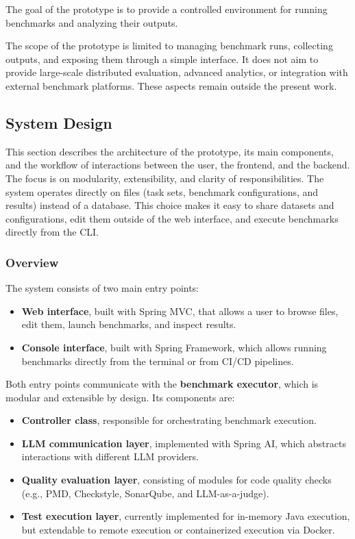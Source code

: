 The goal of the prototype is to provide a controlled environment for running benchmarks and analyzing their outputs.

The scope of the prototype is limited to managing benchmark runs, collecting outputs, and exposing them through a simple interface.
It does not aim to provide large-scale distributed evaluation, advanced analytics, or integration with external benchmark platforms.
These aspects remain outside the present work.

\subsection{System Design}


This section describes the architecture of the prototype, its main components, and the workflow of interactions between the user, the frontend, and the backend.
The focus is on modularity, extensibility, and clarity of responsibilities.
The system operates directly on files (task sets, benchmark configurations, and results) instead of a database.
This choice makes it easy to share datasets and configurations, edit them outside of the web interface, and execute benchmarks directly from the CLI.

\subsubsection{Overview}

The system consists of two main entry points:
\begin{itemize}
    \item \textbf{Web interface}, built with Spring MVC, that allows a user to browse files, edit them, launch benchmarks, and inspect results.
    \item \textbf{Console interface}, built with Spring Framework, which allows running benchmarks directly from the terminal or from CI/CD pipelines.
\end{itemize}

Both entry points communicate with the \textbf{benchmark executor}, which is modular and extensible by design.
Its components are:
\begin{itemize}
    \item \textbf{Controller class}, responsible for orchestrating benchmark execution.
    \item \textbf{LLM communication layer}, implemented with Spring AI, which abstracts interactions with different LLM providers.
    \item \textbf{Quality evaluation layer}, consisting of modules for code quality checks (e.g., PMD, Checkstyle, SonarQube, and LLM-as-a-judge).
    \item \textbf{Test execution layer}, currently implemented for in-memory Java execution, but extendable to remote execution or containerized execution via Docker.
\end{itemize}

